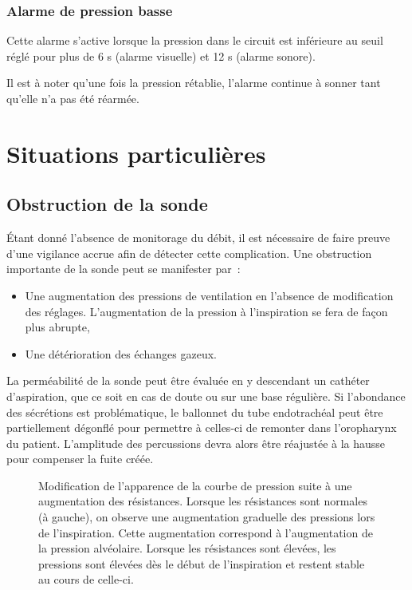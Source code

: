 \subsubsection*{Alarme de pression basse}

Cette alarme s'active lorsque la pression dans le circuit est inférieure
au seuil réglé pour plus de 6 s (alarme visuelle) et 12 s (alarme
sonore).

Il est à noter qu'une fois la pression rétablie, l'alarme continue à
sonner tant qu'elle n'a pas été réarmée.

\section{Situations particulières}

\subsection{Obstruction de la sonde}

Étant donné l’absence de monitorage du débit, il est nécessaire de faire preuve
d’une vigilance accrue afin de détecter cette complication. Une obstruction
importante de la sonde peut se manifester par :
		
\begin{itemize}
	\item Une augmentation des pressions de ventilation en l’absence de
	modification des réglages. L’augmentation de la pression à l’inspiration se
	fera de façon plus abrupte, 
	\item Une détérioration des échanges gazeux.
\end{itemize}

La perméabilité de la sonde peut être évaluée en y descendant un cathéter
d’aspiration, que ce soit en cas de doute ou sur une base régulière.  Si
l’abondance des sécrétions est problématique, le ballonnet du tube endotrachéal
peut être partiellement dégonflé pour permettre à celles-ci de remonter dans
l’oropharynx du patient. L’amplitude des percussions devra alors être réajustée
à la hausse pour compenser la fuite créée.

\begin{figure}

\caption{Modification de l'apparence de la courbe de pression suite à une
augmentation des résistances. Lorsque les résistances sont normales (à gauche),
on observe une augmentation graduelle des pressions lors de l’inspiration.
Cette augmentation correspond à l’augmentation de la pression alvéolaire.
Lorsque les résistances sont élevées, les pressions sont élevées dès le début
de l’inspiration et restent stable au cours de celle-ci.}
\end{figure}


